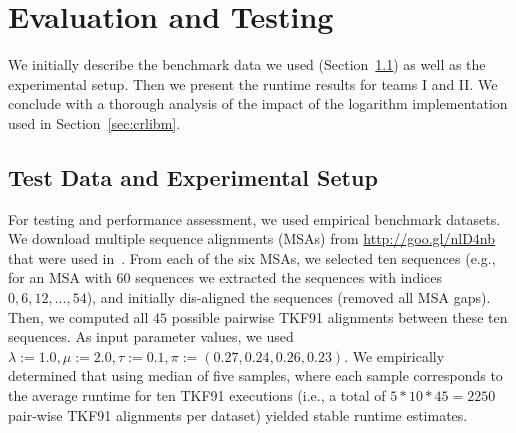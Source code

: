 \documentclass[runningheads,a4paper]{llncs}
\begin{document}
\section{Evaluation and Testing}
\label{sec:evaluation}

We initially describe the benchmark data we used (Section~\ref{ssec:benchmark}) as well as the experimental setup.
Then we present the runtime results for teams I and II. We conclude with a thorough analysis of the impact of the logarithm implementation used
in Section~\ref{sec:crlibm}.


\subsection{Test Data and Experimental Setup}
\label{ssec:benchmark}



For testing and performance assessment, we used empirical benchmark datasets. We download multiple sequence alignments (MSAs) from \url{http://goo.gl/nlD4nb}
that were used in~\cite{bininda2005transalign}.
From each of the six MSAs, we selected ten sequences (e.g., for an MSA with $60$ sequences we extracted the sequences with indices $0, 6, 12, ..., 54$),
and initially dis-aligned the sequences (removed all MSA gaps).
Then, we computed all $45$ possible pairwise TKF91 alignments between
these ten sequences. As input parameter values, we used $\lambda:=1.0, \mu:=2.0, \tau:=0.1, \pi:=(0.27, 0.24, 0.26, 0.23)$.
We empirically determined that using median of five samples, where each sample corresponds to 
the average runtime for ten TKF91 executions (i.e., a total of $5*10*45 = 2250$ pair-wise TKF91 alignments per dataset)
yielded stable runtime estimates.
\end{document}
